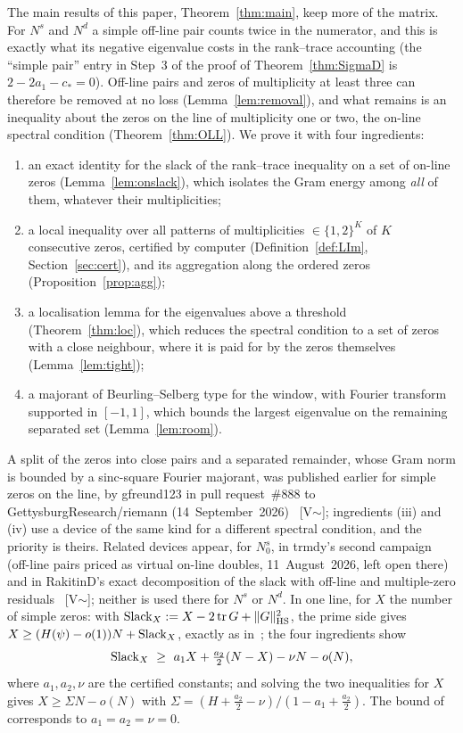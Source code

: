 The main results of this paper, Theorem~\ref{thm:main}, keep more of the matrix. For $N^s$ and $N^d$ a simple off-line pair counts twice in the
numerator, and this is exactly what its negative eigenvalue costs in the rank--trace accounting (the ``simple pair'' entry in Step~3 of the
proof of Theorem~\ref{thm:SigmaD} is $2-2a_1-c_*=0$). Off-line pairs and zeros of multiplicity at least three can therefore be removed at no loss
(Lemma~\ref{lem:removal}), and what remains is an inequality about the zeros on the line of multiplicity one or two, the on-line spectral
condition (Theorem~\ref{thm:OLL}). We prove it with four ingredients:
\begin{enumerate}[label=(\roman*)]
\item an exact identity for the slack of the rank--trace inequality on a set of on-line zeros (Lemma~\ref{lem:onslack}), which isolates the
Gram energy among \emph{all} of them, whatever their multiplicities;
\item a local inequality over all patterns of multiplicities $\bm\in\{1,2\}^K$ of $K$ consecutive zeros, certified by computer
(Definition~\ref{def:LIm}, Section~\ref{sec:cert}), and its aggregation along the ordered zeros (Proposition~\ref{prop:agg});
\item a localisation lemma for the eigenvalues above a threshold (Theorem~\ref{thm:loc}), which reduces the spectral condition to a set of
zeros with a close neighbour, where it is paid for by the zeros themselves (Lemma~\ref{lem:tight});
\item a majorant of Beurling--Selberg type for the window, with Fourier transform supported in $[-1,1]$, which bounds the largest eigenvalue on
the remaining separated set (Lemma~\ref{lem:room}).
\end{enumerate}
A split of the zeros into close pairs and a separated remainder, whose Gram norm is bounded by a sinc-square Fourier majorant, was published
earlier for simple zeros on the line, by \mbox{gfreund123} in pull request~\#888 to \mbox{GettysburgResearch/riemann}
(14~September~2026)~\cite{Gettysburg888} [V$\sim$]; ingredients (iii) and (iv) use a device of the same kind for a different spectral
condition, and the priority is theirs. Related devices appear, for $N_0^s$, in \mbox{trmdy}'s second campaign~\cite{trmdy} (off-line pairs priced as virtual on-line
doubles, 11~August~2026, left open there) and in \mbox{RakitinD}'s exact decomposition of the slack with off-line and multiple-zero
residuals~\cite{Rakitin} [V$\sim$]; neither is used there for $N^s$ or $N^d$.
In one line, for $X$ the number of simple zeros: with $\operatorname{Slack}_X:=X-2\operatorname{tr} G+\lVert G\rVert_{\mathrm{HS}}^2$, the prime side gives
$X\ge(H(\psi)-o(1))N+\operatorname{Slack}_X$, exactly as in~\cite{AF}; the four ingredients show
\[
\Slack_X\ \ge\ a_1X+\tfrac{a_2}2(N-X)-\nu N-o(N),
\]
where $a_1,a_2,\nu$ are the certified constants; and solving the two inequalities for $X$ gives
$X\ge\Sigma N-o(N)$ with $\Sigma=(H+\frac{a_2}2-\nu)/(1-a_1+\frac{a_2}2)$. The bound of~\cite{AF} corresponds to $a_1=a_2=\nu=0$.


